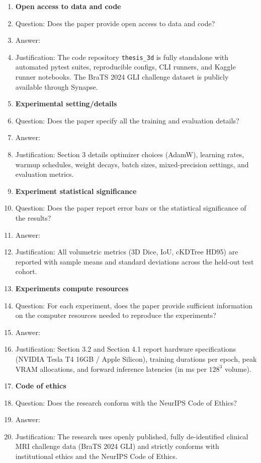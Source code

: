 \begin{enumerate}
\item {\bf Open access to data and code}
    \item[] Question: Does the paper provide open access to data and code?
    \item[] Answer: \answerYes{}
    \item[] Justification: The code repository \texttt{thesis\_3d} is fully standalone with automated pytest suites, reproducible configs, CLI runners, and Kaggle runner notebooks. The BraTS 2024 GLI challenge dataset is publicly available through Synapse.

\item {\bf Experimental setting/details}
    \item[] Question: Does the paper specify all the training and evaluation details?
    \item[] Answer: \answerYes{}
    \item[] Justification: Section 3 details optimizer choices (AdamW), learning rates, warmup schedules, weight decays, batch sizes, mixed-precision settings, and evaluation metrics.

\item {\bf Experiment statistical significance}
    \item[] Question: Does the paper report error bars or the statistical significance of the results?
    \item[] Answer: \answerYes{}
    \item[] Justification: All volumetric metrics (3D Dice, IoU, cKDTree HD95) are reported with sample means and standard deviations across the held-out test cohort.

\item {\bf Experiments compute resources}
    \item[] Question: For each experiment, does the paper provide sufficient information on the computer resources needed to reproduce the experiments?
    \item[] Answer: \answerYes{}
    \item[] Justification: Section 3.2 and Section 4.1 report hardware specifications (NVIDIA Tesla T4 16GB / Apple Silicon), training durations per epoch, peak VRAM allocations, and forward inference latencies (in ms per $128^3$ volume).

\item {\bf Code of ethics}
    \item[] Question: Does the research conform with the NeurIPS Code of Ethics?
    \item[] Answer: \answerYes{}
    \item[] Justification: The research uses openly published, fully de-identified clinical MRI challenge data (BraTS 2024 GLI) and strictly conforms with institutional ethics and the NeurIPS Code of Ethics.


\end{enumerate}
